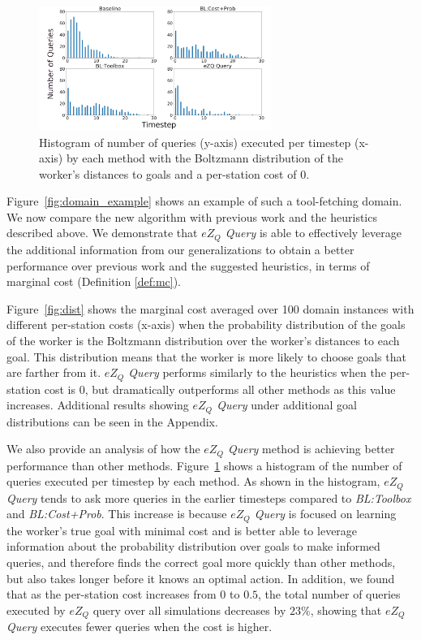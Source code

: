 \documentclass[letterpaper]{article}
\begin{document}
\begin{figure}[t]
\centering
\includegraphics[width=\linewidth,height=1.593in ]{Figures/Boltzmann_Positive_hist_c0_subfigures.png}
\caption{Histogram of number of queries (y-axis) executed per timestep (x-axis) by each method with the Boltzmann distribution of the worker's distances to goals and a per-station cost of 0.}
\label{fig:hist}
\end{figure}

\vspace{-1.92mm}
Figure~\ref{fig:domain_example} shows an example of such a tool-fetching domain. We now compare the new algorithm with previous work and the heuristics described above. We demonstrate that \emph{$eZ_Q$ Query} is able to effectively leverage the additional information from our generalizations to obtain a better performance over previous work and the suggested heuristics, in terms of marginal cost (Definition \ref{def:mc}).

Figure~\ref{fig:dist} shows the marginal cost averaged over 100 domain instances with different per-station costs (x-axis) when the probability distribution of the goals of the worker is the Boltzmann distribution over the worker's distances to each goal. This distribution means that the worker is more likely to choose goals that are farther from it. \emph{$eZ_Q$ Query} performs similarly to the heuristics when the per-station cost is 0, but dramatically outperforms all other methods as this value increases.
Additional results showing \emph{$eZ_Q$ Query} under additional goal distributions can be seen in the Appendix.

We also provide an analysis of how the \emph{$eZ_Q$ Query} method is achieving better performance than other methods. Figure~\ref{fig:hist} shows a histogram of the number of queries executed per timestep by each method. As shown in the histogram, \emph{$eZ_Q$ Query} tends to ask more queries in the earlier timesteps compared to \emph{BL:Toolbox} and \emph{BL:Cost+Prob}. This increase is because \emph{$eZ_Q$ Query} is focused on learning the worker's true goal with minimal cost and is better able to leverage information about the probability distribution over goals to make informed queries, and therefore finds the correct goal more quickly than other methods, but also takes longer before it knows an optimal action.
In addition, we found that as the per-station cost increases from $0$ to $0.5$, the total number of queries executed by $eZ_Q$ query over all simulations decreases by $23\%$, showing that \emph{$eZ_Q$ Query} executes fewer queries when the cost is higher.
\end{document}
